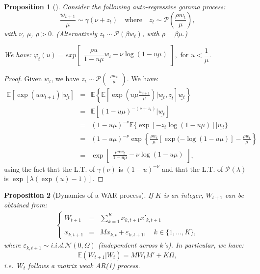\documentclass[
  12pt,
]{book}
\newtheorem{proposition}{Proposition}[chapter]
\theoremstyle{definition}
\theoremstyle{definition}
\theoremstyle{definition}
\theoremstyle{definition}
\theoremstyle{remark}
\begin{document}
\begin{proposition}[]
\protect\hypertarget{prp:LTARG}{}\label{prp:LTARG}Consider the following auto-regressive gamma process:
\[
\frac{w_{t+1}}{\mu} \sim \gamma(\nu+z_t) \quad \mbox{where} \quad z_t \sim \mathcal{P} \left( \frac{\rho w_t}{\mu} \right),
\]
with \(\nu\), \(\mu\), \(\rho > 0\). (Alternatively \(z_t \sim {\mathcal{P}}(\beta w_t)\), with \(\rho = \beta \mu\).)

We have:
\(\varphi_t(u) = exp \left[ \begin{array}{l} \dfrac{\rho u}{1-u \mu} w_t - \nu \log(1-u \mu)\end{array} \right], \mbox{ for } u < \dfrac{1}{\mu}\).
\end{proposition}

\begin{proof}
Given \(\underline{w_t}\), we have \(z_t \sim {\mathcal P}\left( \begin{array}{l} \frac{\rho w_t} {\mu} \end{array}\right)\). We have:
\begin{eqnarray*}
\mathbb{E}[\exp(u w_{t+1})|\underline{w_t}] &=& \mathbb{E}\left\{\mathbb{E}\left[\exp \left(u \mu  \frac{w_{t+1}}{\mu}\right)|\underline{w_t}, \underline{z}_t\right]\underline{w_t}\right\}\\
&=& \mathbb{E}[(1-u\mu)^{-(\nu+z_t)}|\underline{w_t}] \\
&=& (1-u\mu)^{-\nu}\mathbb{E}\{\exp[-z_t   \log(1-u\mu)]|\underline{w_t}\} \\
&=& (1-u\mu)^{-\nu} \exp \left\{\frac{\rho w_t}{\mu}[\exp(-\log(1-u\mu)] -  \frac{\rho w_t}{\mu}\right\}\\
&=& \exp\left[ \begin{array}{l}  \frac{\rho u w_t}{1-u\mu} - \nu   \log(1-u\mu)  \end{array}\right],
\end{eqnarray*}
using the fact that the L.T. of \(\gamma(\nu)\) is \((1-u)^{-\nu}\)
and that the L.T. of \({\mathcal P}(\lambda)\) is \(\exp[\lambda(\exp(u)-1)]\).
\end{proof}

\begin{proposition}[Dynamics of a WAR process]
\protect\hypertarget{prp:WARAR}{}\label{prp:WARAR}If \(K\) is an integer, \(W_{t+1}\) can be obtained from:
\begin{eqnarray*}
\left\{
\begin{array}{ccl}
W_{t+1} & =&  \sum^K_{k=1} x_{k,t+1} x'_{k,t+1}\\
&&\\
x_{k,t+1} & =& M x_{k,t} + \varepsilon_{k,t+1},\quad k \in \{1,\dots,K\},
\end{array}
\right.
\end{eqnarray*}
where \(\varepsilon_{k,t+1} \sim i.i.d. \mathcal{N}(0, \Omega)\) (independent across \(k\)'s).
In particular, we have:
\[
\mathbb{E}(W_{t+1}|\underline{W_t}) = MW_tM'+K \Omega,
\]
i.e.~\(W_t\) follows a matrix weak AR(1) process.
\end{proposition}
\end{document}
